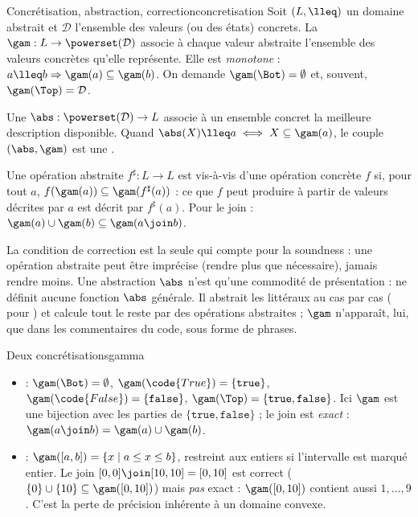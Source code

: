 \begin{definition}{Concrétisation, abstraction, correction}{concretisation}
  Soit $(L, \lleq)$ un domaine abstrait et $\mathcal{D}$ l'ensemble des
  valeurs (ou des états) concrets. La 
  $\gam : L \to \powerset(\mathcal{D})$ associe à chaque valeur abstraite
  l'ensemble des valeurs concrètes qu'elle représente. Elle est
  \emph{monotone} : $a \lleq b \Rightarrow \gam(a) \subseteq \gam(b)$. On
  demande $\gam(\Bot) = \emptyset$ et, souvent, $\gam(\Top) = \mathcal{D}$.

  Une  $\abs : \powerset(\mathcal{D}) \to L$ associe à un
  ensemble concret la meilleure description disponible. Quand
  $\abs(X) \lleq a \iff X \subseteq \gam(a)$, le couple $(\abs, \gam)$ est une
  .

  Une opération abstraite $f^\sharp : L \to L$ est  vis-à-vis
  d'une opération concrète $f$ si, pour tout $a$,
  $f(\gam(a)) \subseteq \gam(f^\sharp(a))$ : ce que $f$ peut produire à partir
  de valeurs décrites par $a$ est décrit par $f^\sharp(a)$. Pour le join :
  $\gam(a) \cup \gam(b) \subseteq \gam(a \join b)$.
\end{definition}

La condition de correction est la seule qui compte pour la soundness : une
opération abstraite peut être imprécise (rendre plus que nécessaire), jamais
rendre moins. Une abstraction $\abs$ n'est qu'une commodité de présentation :
\reactant{} ne définit aucune fonction $\abs$ générale. Il abstrait les
littéraux au cas par cas ( pour ) et calcule
tout le reste par des opérations abstraites ; $\gam$ n'apparaît, lui, que dans
les commentaires du code, sous forme de phrases.

\begin{exemple}{Deux concrétisations}{gamma}
  \begin{itemize}
    \item {} : $\gam(\Bot) = \emptyset$,
      $\gam(\code{True}) = \{\mathtt{true}\}$,
      $\gam(\code{False}) = \{\mathtt{false}\}$,
      $\gam(\Top) = \{\mathtt{true}, \mathtt{false}\}$. Ici $\gam$ est une
      bijection avec les parties de $\{\mathtt{true},\mathtt{false}\}$ ; le
      join est \emph{exact} : $\gam(a \join b) = \gam(a) \cup \gam(b)$.
    \item {} : $\gam([a,b]) = \{x \mid a \le x \le b\}$, restreint
      aux entiers si l'intervalle est marqué entier. Le join
      $[0,0] \join [10,10] = [0,10]$ est correct
      ($\{0\} \cup \{10\} \subseteq \gam([0,10])$) mais \emph{pas} exact :
      $\gam([0,10])$ contient aussi $1, \dots, 9$. C'est la perte de précision
      inhérente à un domaine convexe.
  \end{itemize}
\end{exemple}

